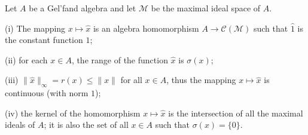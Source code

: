 Let $A$ be a Gel'fand algebra and let $\mathcal{M}$ be the maximal ideal space of $A$.

(i) The mapping $x \mapsto \hat{x}$ is an algebra homomorphism $A \to \mathcal{C}(\mathcal{M})$ such that $\hat{1}$ is the constant function $1$;

(ii) for each $x \in A$, the range of the function $\hat{x}$ is $\sigma(x)$;

(iii) $\|\hat{x}\|_\infty = r(x) \leq \|x\|$ for all $x \in A$, thus the mapping $x \mapsto \hat{x}$ is continuous (with norm $1$);

(iv) the kernel of the homomorphism $x \mapsto \hat{x}$ is the intersection of all the maximal ideals of $A$; it is also the set of all $x \in A$ such that $\sigma(x) = \{0\}$.
